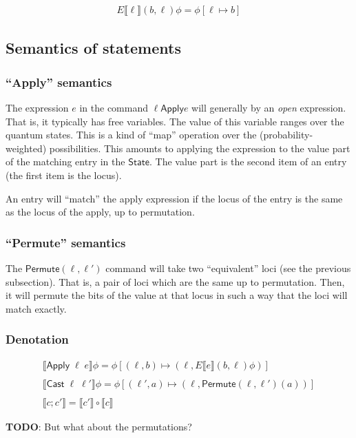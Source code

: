 \documentclass[runningheads]{llncs}
\newcommand {\State} {\textsf{State}}
\newcommand {\sem} [1] {\llbracket #1 \rrbracket}
\newcommand {\Esem} [1] {E\sem{#1}}
\newcommand {\Apply} {\textsf{Apply}}
\newcommand {\Cast} {\textsf{Cast}}
\newcommand {\Permute} {\textsf{Permute}}
\begin{document}
\[
  \begin{array}{c}
    \Esem{\ell}(b, \ell)\phi = \phi[\ell \mapsto b]
  \end{array}
\]

\subsection{Semantics of statements}

\subsubsection{``Apply'' semantics}

The expression $e$ in the command $\ell \Apply e$ will generally by an \textit{open} expression. That is, it typically has free variables. The value of this variable ranges over the quantum states. This is a kind of ``map'' operation over the (probability-weighted) possibilities. This amounts to applying the expression to the value part of the matching entry in the $\State$. The value part is the second item of an entry (the first item is the locus).

An entry will ``match'' the apply expression if the locus of the entry is the same as the locus of the apply, up to permutation.

\subsubsection{``Permute'' semantics}

The $\Permute(\ell, \ell')$ command will take two ``equivalent'' loci (see the previous subsection). That is, a pair of loci which are the same up to permutation. Then, it will permute the bits of the value at that locus in such a way that the loci will match exactly.


\subsubsection{Denotation}

\[
  \begin{array}{c}
    \sem{\Apply\;\ell\;e}\phi = \phi[(\ell, b) \mapsto
               (\ell, \Esem{e}(b, \ell)\phi)]\\\\
    \sem{\Cast\;\ell\;\ell'}\phi = \phi[(\ell', a) \mapsto (\ell, \Permute(\ell, \ell')(a))]\\\\
    \sem{c;c'} = \sem{c'} \circ \sem{c}
  \end{array}
\]

\textbf{TODO}: But what about the permutations?
\end{document}
